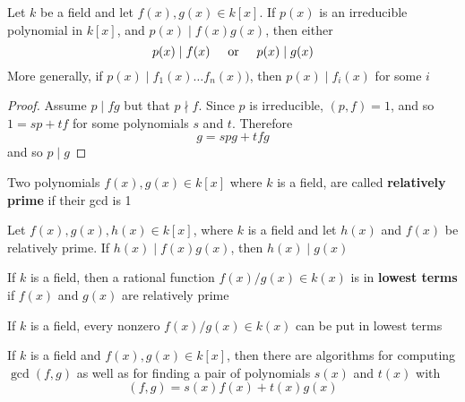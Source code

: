\documentclass[11pt]{article}
\begin{document}
\begin{theorem}
Let \(k\) be a field and let \(f(x),g(x)\in k[x]\). If \(p(x)\) is an irreducible
polynomial in \(k[x]\), and \(p(x)\mid f(x)g(x)\), then either
\begin{equation*}
p(x)\mid f(x)\hspace{0.5cm}\text{or}\hspace{0.5cm}p(x)\mid g(x)
\end{equation*}
More generally, if \(p(x)\mid f_1(x)\dots f_n(x))\), then \(p(x)\mid f_i(x)\)
for some \(i\)
\end{theorem}

\begin{proof}
Assume \(p\mid fg\) but that \(p\nmid f\). Since \(p\) is irreducible, \((p,f)=1\),
and so \(1=sp+tf\) for some polynomials \(s\) and \(t\). Therefore
\begin{equation*}
g=spg+tfg
\end{equation*}
and so \(p\mid g\)
\end{proof}

\begin{definition}[]
Two polynomials \(f(x),g(x)\in k[x]\) where \(k\) is a field, are called
\textbf{relatively prime} if their gcd is 1
\end{definition}

\begin{corollary}[]
Let \(f(x),g(x),h(x)\in k[x]\), where \(k\) is a field and let \(h(x)\) and
\(f(x)\) be relatively prime. If \(h(x)\mid f(x)g(x)\), then \(h(x)\mid g(x)\)
\end{corollary}

\begin{definition}[]
If \(k\) is a field, then a rational function \(f(x)/g(x)\in k(x)\) is in
\textbf{lowest terms} if \(f(x)\) and \(g(x)\) are relatively prime
\end{definition}


\begin{proposition}[]
If \(k\) is a field, every nonzero \(f(x)/g(x)\in k(x)\) can be put in lowest terms
\end{proposition}


\begin{theorem}
If \(k\) is a field and \(f(x),g(x)\in k[x]\), then there are algorithms for
computing \(\gcd(f,g)\) as well as for finding a pair of polynomials \(s(x)\)
and \(t(x)\) with 
\begin{equation*}
(f,g)=s(x)f(x)+t(x)g(x)
\end{equation*}
\end{theorem}
\end{document}
